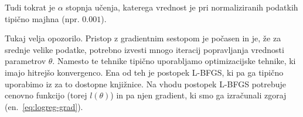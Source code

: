 Tudi tokrat je $\alpha$ stopnja učenja, katerega vrednost je pri normaliziranih podatkih tipično majhna (npr. $0.001$).

Tukaj velja opozorilo. Pristop z gradientnim sestopom je počasen in je, že za srednje velike podatke, potrebno izvesti mnogo iteracij popravljanja vrednosti parametrov $\theta$. Namesto te tehnike tipično uporabljamo optimizacijske tehnike, ki imajo hitrejšo konvergenco. Ena od teh je postopek L-BFGS, ki pa ga tipično uporabimo iz za to dostopne knjižnice. Na vhodu postopek L-BFGS potrebuje cenovno funkcijo (torej $l(\theta)$) in pa njen gradient, ki smo ga izračunali zgoraj (en.~\ref{eq:logreg-grad}).
